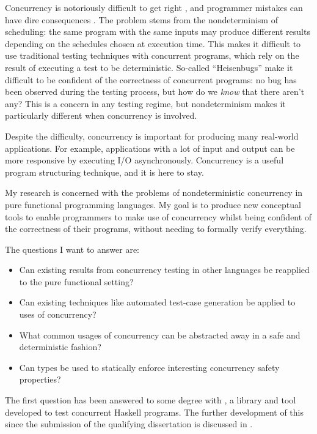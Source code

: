 Concurrency is notoriously difficult to get right \citep{overrated},
and programmer mistakes can have dire consequences
\citep{therac25}. The problem stems from the nondeterminism of
scheduling: the same program with the same inputs may produce
different results depending on the schedules chosen at execution
time. This makes it difficult to use traditional testing techniques
with concurrent programs, which rely on the result of executing a test
to be deterministic. So-called ``Heisenbugs'' make it difficult to be
confident of the correctness of concurrent programs: no bug has been
observed during the testing process, but how do we \emph{know} that
there aren't any? This is a concern in any testing regime, but
nondeterminism makes it particularly different when concurrency is
involved.

Despite the difficulty, concurrency is important for producing many
real-world applications. For example, applications with a lot of input
and output can be more responsive by executing I/O asynchronously.
Concurrency is a useful program structuring technique, and it is here
to stay.

My research is concerned with the problems of nondeterministic
concurrency in pure functional programming languages. My goal is to
produce new conceptual tools to enable programmers to make use of
concurrency whilst being confident of the correctness of their
programs, without needing to formally verify everything.

The questions I want to answer are:

\begin{itemize}
\item Can existing results from concurrency testing in other languages
  be reapplied to the pure functional setting?

\item Can existing techniques like automated test-case generation be
  applied to uses of concurrency?

\item What common usages of concurrency can be abstracted away in a
  safe and deterministic fashion?

\item Can types be used to statically enforce interesting concurrency
  safety properties?
\end{itemize}

The first question has been answered to some degree with \dejafu{}
\citep{dejafu}, a library and tool developed to test concurrent
Haskell programs. The further development of this since the submission
of the qualifying dissertation is discussed in .
